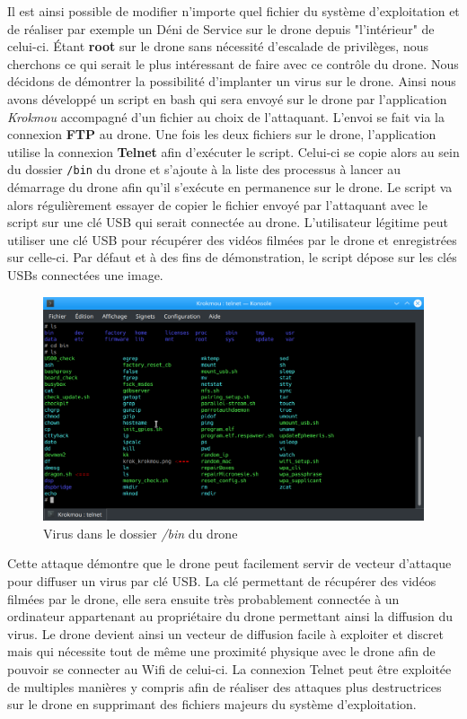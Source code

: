 Il est ainsi possible de modifier n'importe quel fichier du système d'exploitation et de réaliser par exemple un Déni de Service sur le drone depuis "l'intérieur" de celui-ci. Étant \textbf{root} sur le drone sans nécessité d'escalade de privilèges, nous cherchons ce qui serait le plus intéressant de faire avec ce contrôle du drone. Nous décidons de démontrer la possibilité d'implanter un virus sur le drone. Ainsi nous avons développé un script en bash qui sera envoyé sur le drone par l'application \textit{Krokmou} accompagné d'un fichier au choix de l'attaquant. L'envoi se fait via la connexion \textbf{FTP} au drone. Une fois les deux fichiers sur le drone, l'application utilise la connexion \textbf{Telnet} afin d'exécuter le script. Celui-ci se copie alors au sein du dossier \verb!/bin! du drone et s'ajoute à la liste des processus à lancer au démarrage du drone afin qu'il s'exécute en permanence sur le drone. Le script va alors régulièrement essayer de copier le fichier envoyé par l'attaquant avec le script sur une clé USB qui serait connectée au drone. L'utilisateur légitime peut utiliser une clé USB pour récupérer des vidéos filmées par le drone et enregistrées sur celle-ci. Par défaut et à des fins de démonstration, le script dépose sur les clés USBs connectées une image.

\begin{figure}[H]
  \centering
  \includegraphics[scale=0.35]{images/bin_folder.png}
  \caption{Virus dans le dossier \textit{/bin} du drone}
\end{figure}

Cette attaque démontre que le drone peut facilement servir de vecteur d'attaque pour diffuser un virus par clé USB. La clé permettant de récupérer des vidéos filmées par le drone, elle sera ensuite très probablement connectée à un ordinateur appartenant au propriétaire du drone permettant ainsi la diffusion du virus. Le drone devient ainsi un vecteur de diffusion facile à exploiter et discret mais qui nécessite tout de même une proximité physique avec le drone afin de pouvoir se connecter au Wifi de celui-ci.
\newline La connexion Telnet peut être exploitée de multiples manières y compris afin de réaliser des attaques plus destructrices sur le drone en supprimant des fichiers majeurs du système d'exploitation.


